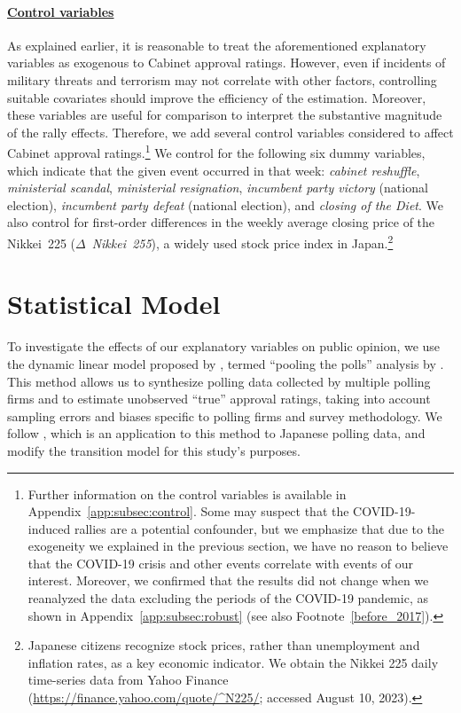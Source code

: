 \documentclass[letterpaper,12pt]{scrartcl}
\begin{document}
\bigskip
\noindent \paragraph{\uline{Control variables}}
As explained earlier, it is reasonable to treat the aforementioned explanatory variables as exogenous to Cabinet approval ratings. However, even if incidents of military threats and terrorism may not correlate with other factors, controlling suitable covariates should improve the efficiency of the estimation. Moreover, these variables are useful for comparison to interpret the substantive magnitude of the rally effects. Therefore, we add several control variables considered to affect Cabinet approval ratings.\footnote{Further information on the control variables is available in Appendix~\ref{app:subsec:control}. Some may suspect that the COVID-19-induced rallies are a potential confounder, but we emphasize that due to the exogeneity we explained in the previous section, we have no reason to believe that the COVID-19 crisis and other events correlate with events of our interest. Moreover, we confirmed that the results did not change when we reanalyzed the data excluding the periods of the COVID-19 pandemic, as shown in Appendix~\ref{app:subsec:robust} (see also Footnote~\ref{before_2017}).} We control for the following six dummy variables, which indicate that the given event occurred in that week: \emph{cabinet reshuffle}, \emph{ministerial scandal}, \emph{ministerial resignation}, \emph{incumbent party victory} (national election), \emph{incumbent party defeat} (national election), and \emph{closing of the Diet}. We also control for first-order differences in the weekly average closing price of the Nikkei~225 ($\mathit{\Delta}$~\emph{Nikkei~255}), a widely used stock price index in Japan.\footnote{Japanese citizens recognize stock prices, rather than unemployment and inflation rates, as a key economic indicator. We obtain the Nikkei 225 daily time-series data from Yahoo Finance (\url{https://finance.yahoo.com/quote/^N225/}; accessed August 10, 2023).}

\section*{Statistical Model\centering}

To investigate the effects of our explanatory variables on public opinion, we use the dynamic linear model proposed by \citet{Jackman2005AustJPolitSci}, termed ``pooling the polls'' analysis by \citet{Jackman2009}. This method allows us to synthesize polling data collected by multiple polling firms and to estimate unobserved ``true'' approval ratings, taking into account sampling errors and biases specific to polling firms and survey methodology. We follow \citet{Miwa2018POQ}, which is an application to this method to Japanese polling data, and modify the transition model for this study's purposes.
\end{document}
